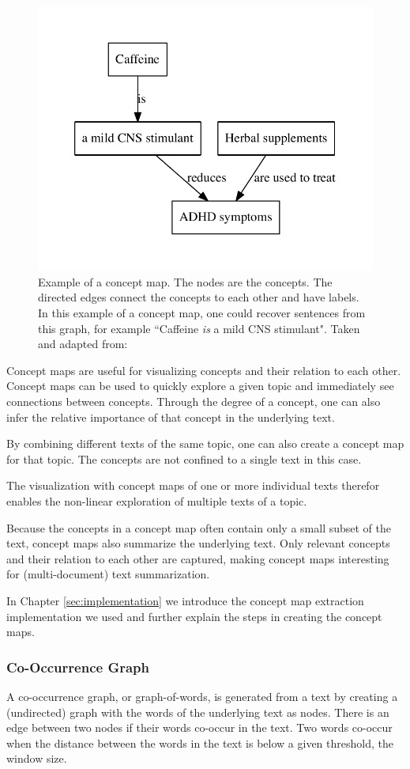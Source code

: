 \begin{figure}[ht]
\centering
\includegraphics[width=0.5\linewidth]{assets/figures/concept_map.pdf}
\caption{Example of a concept map. The nodes are the concepts. The directed edges connect the concepts to each other and have labels. In this example of a concept map, one could recover sentences from this graph, for example ``Caffeine \textit{is} a mild CNS stimulant". Taken and adapted from: \cite{Falke2017}}
\label{fig:concept_map}
\end{figure}

Concept maps are useful for visualizing concepts and their relation to each other.
Concept maps can be used to quickly explore a given topic and immediately see connections between concepts.
Through the degree of a concept, one can also infer the relative importance of that concept in the underlying text.

By combining different texts of the same topic, one can also create a concept map for that topic.
The concepts are not confined to a single text in this case.

The visualization with concept maps of one or more individual texts therefor enables the non-linear exploration of multiple texts of a topic.

Because the concepts in a concept map often contain only a small subset of the text, concept maps also summarize the underlying text.
Only relevant concepts and their relation to each other are captured, making concept maps interesting for (multi-document) text summarization.

In Chapter \ref{sec:implementation} we introduce the concept map extraction implementation we used and further explain the steps in creating the concept maps.


\subsubsection{Co-Occurrence Graph}
A co-occurrence graph, or graph-of-words, is generated from a text by creating a (undirected) graph with the words of the underlying text as nodes.
There is an edge between two nodes if their words co-occur in the text.
Two words co-occur when the distance between the words in the text is below a given threshold, the window size.

